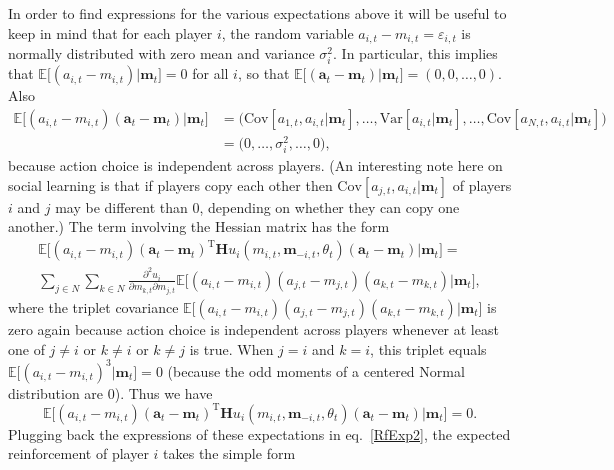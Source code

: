 \documentclass[11pt,reqno]{amsart}
\newcommand{\e}{\theta} %
\newcommand{\ac}{a} %
\newcommand{\va}{\mathbf{a}} %
\newcommand{\Esp}{\mathds{E}} %
\newcommand{\np}{N}%
\newcommand{\tm}{t}%
\newcommand{\pf}{u} %
\newcommand{\ma}{m} %
\newcommand{\sd}{\sigma} %
\newcommand{\vma}{\boldsymbol{\ma}} %
\newcommand{\pd}{\partial}
\newcommand{\Hs}{\mathbf{H}} %
\newcommand{\var}{\mathrm{Var}}
\newcommand{\cov}{\mathrm{Cov}}
\begin{document}
In order to find expressions for the various expectations above it will be useful to keep in mind that for each player $i$, the random variable $\ac_{i,\tm}- \ma_{i,\tm}=\varepsilon_{i,t}$ is normally distributed with zero mean and variance $\sd_{i}^2$. In particular, this implies that $\Esp \Big[ (\ac_{i,\tm}- \ma_{i,\tm}) \Big| \vma_\tm \Big] = 0$ for all $i$, so that $\Esp \Big[ (\va_\tm  - \vma_\tm) \Big| \vma_\tm \Big] = (0, 0, \dots,0)$. Also
\begin{align}
\label{RfExp3}
\Esp \Big[ (\ac_{i,\tm}- \ma_{i,\tm}) (\va_\tm  - \vma_\tm) \Big| \vma_\tm \Big] & = \Big( \cov[\ac_{1,\tm},\ac_{i,\tm} | \vma_\tm],\dots,\var[\ac_{i,\tm}| \vma_\tm] ,\dots, \cov[\ac_{\np,\tm},\ac_{i,\tm}| \vma_\tm] \Big) \nonumber\\ 
 & = \Big( 0,\dots,\sd_{i}^2,\dots, 0 \Big),
\end{align}
because action choice is independent across players. (An interesting note here on social learning is that if players copy each other then $\cov[\ac_{j,\tm},\ac_{i,\tm}| \vma_\tm]$ of players $i$ and $j$ may be different than 0, depending on whether they can copy one another.) The term involving the Hessian matrix has the form
\begin{multline}
\label{RfExpH}
\Esp \Big[ (\ac_{i,\tm}- \ma_{i,\tm}) (\va_\tm  - \vma_\tm)^{\textrm{T}} \Hs \pf_{i}(\ma_{i,\tm},\vma_{-i,\tm},\e_\tm) (\va_\tm  - \vma_\tm) \Big| \vma_\tm \Big] = \\
 \sum_{j\in\np} \sum_{k\in\np} \frac{\pd^2 \pf_{i}}{\pd \ma_{k,\tm} \pd \ma_{j,\tm}} \Esp \Big[ (\ac_{i,\tm}- \ma_{i,\tm}) (\ac_{j,\tm}- \ma_{j,\tm}) (\ac_{k,\tm}- \ma_{k,\tm}) \Big| \vma_\tm \Big],
\end{multline}
where the triplet covariance $\Esp \Big[ (\ac_{i,\tm}- \ma_{i,\tm}) (\ac_{j,\tm}- \ma_{j,\tm}) (\ac_{k,\tm}- \ma_{k,\tm}) \Big| \vma_\tm \Big] $ is zero again because action choice is independent across players whenever at least one of  $j\neq i$ or $k\neq i$ or $k\neq j$ is true. When $j=i$ and $k=i$, this triplet equals $\Esp \Big[ (\ac_{i,\tm}- \ma_{i,\tm})^3 \Big| \vma_\tm \Big]=0$ (because the odd moments of a centered Normal distribution are 0). Thus we have
\begin{equation}
\label{RfExpH2}
\Esp \Big[ (\ac_{i,\tm}- \ma_{i,\tm}) (\va_\tm  - \vma_\tm)^{\textrm{T}} \Hs \pf_{i}(\ma_{i,\tm},\vma_{-i,\tm},\e_\tm) (\va_\tm  - \vma_\tm) \Big| \vma_\tm \Big] = 0.
\end{equation}
Plugging back the expressions of these expectations in eq.~\ref{RfExp2}, the expected reinforcement of player $i$ takes the simple form
\end{document}
